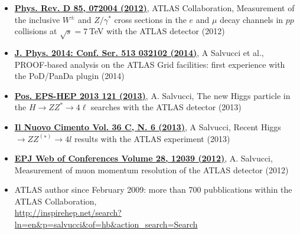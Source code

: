 \begin{cvinterests}
{\begin{itemize}[labelwidth=0.05in,align=right,leftmargin=!,labelsep=0pt,
itemsep=0.0em]
ATLAS Collaboration, Search for the Standard Model Higgs boson in the decay
channel $H\to ZZ^{*}\to 4\ell$ with \SI{4.8}{\per\femto\barn} of $pp$ collision
data at $\sqrt{s}=7$ \si{\tera\electronvolt} with ATLAS (2012)
%
\item[] \href{http://journals.aps.org/prd/abstract/10.1103/PhysRevD.85.072004}{\textbf{Phys. Rev. D 85, 072004 (2012)}},
ATLAS Collaboration, Measurement of the inclusive $W^{\pm}$ and $Z/\gamma^{*}$
cross sections in the $e$ and $\mu$ decay channels in $pp$ collisions at
$\sqrt{s}=7$ \si{\tera\electronvolt} with the ATLAS detector (2012)
%
\item[] \href{http://iopscience.iop.org/1742-6596/513/3/032102}{\textbf{J. Phys. 2014: Conf. Ser. 513 032102 (2014)}},
A Salvucci et al., PROOF-based analysis on the ATLAS Grid facilities: first
experience with the PoD/PanDa plugin (2014)
%
\item[] \href{http://pos.sissa.it/cgi-bin/reader/conf.cgi?confid=180}{\textbf{Pos. EPS-HEP 2013 121 (2013)}},
A. Salvucci, The new Higgs particle in the $H\to ZZ^{*}\to 4\ell$ searches with
the ATLAS detector (2013)
%
\item[] \href{https://www.sif.it/riviste/sif/ncc/econtents/2013/036/06/article/12}{\textbf{Il Nuovo Cimento Vol. 36 C, N. 6 (2013)}},
A Salvucci, Recent Higgs $\to ZZ^{(∗)}\to  4l$ results with the ATLAS experiment
(2013)
%
\item[] \href{http://www.epj-conferences.org/articles/epjconf/abs/2012/10/epjconf_hcp2012_12039/epjconf_hcp2012_12039.html}{\textbf{EPJ Web of Conferences Volume 28, 12039 (2012)}},
A. Salvucci, Measurement of muon momentum resolution of the ATLAS detector
(2012)
%
\item[] ATLAS author since February 2009: more than 700 pubblications within
the ATLAS Collaboration,\\
  {\scriptsize{\href{http://inspirehep.net/search?ln=en&p=salvucci&of=hb&action_search=Search}{http://inspirehep.net/search?ln=en\&p=salvucci\&of=hb\&action\_search=Search}}}
%
\end{itemize}
}

\end{cvinterests}



